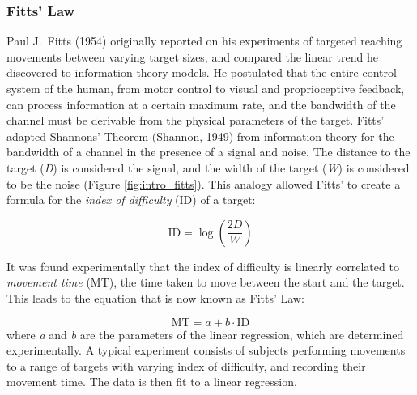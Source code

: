 \subsubsection{Fitts' Law}
\label{fitts-law}

Paul J.\ Fitts (1954) originally reported on his experiments of targeted reaching movements between varying target sizes, and compared the linear trend he discovered to information theory models.
He postulated that the entire control system of the human, from motor control to visual and proprioceptive feedback, can process information at a certain maximum rate, and the bandwidth of the channel must be derivable from the physical parameters of the target.
Fitts' adapted Shannons' Theorem (Shannon, 1949) from information theory for the bandwidth of a channel in the presence of a signal and noise.
The distance to the target (\emph{D}) is considered the signal, and the width of the target (\emph{W}) is considered to be the noise (Figure \ref{fig:intro_fitts}).
This analogy allowed Fitts' to create a formula for the \emph{index of difficulty} (\(\text{ID}\)) of a target:

\begin{equation}
    \mathrm{ID} = \log\left(\frac{2D}{W}\right)
    \label{eq:intro_id}
\end{equation}

It was found experimentally that the index of difficulty is linearly correlated to \emph{movement time} (MT), the time taken to move between the start and the target.
This leads to the equation that is now known as Fitts' Law:

\begin{equation}
    \mathrm{MT} = a + b \cdot \mathrm{ID}
\end{equation}
where \emph{a} and \emph{b} are the parameters of the linear regression, which are determined experimentally.
A typical experiment consists of subjects performing movements to a range of targets with varying index of difficulty, and recording their movement time.
The data is then fit to a linear regression.

